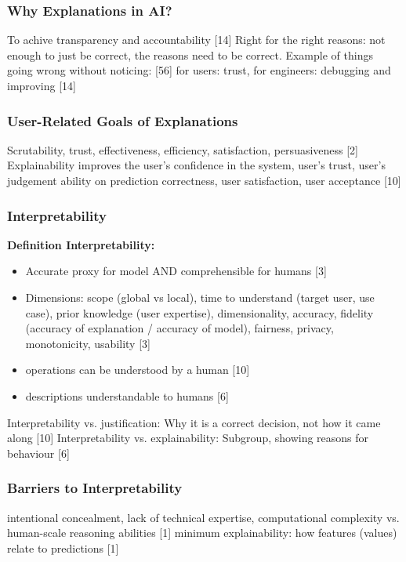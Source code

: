 \subsubsection{Why Explanations in AI?}
To achive transparency and accountability [14] \newline
Right for the right reasons: not enough to just be correct, the reasons need to be correct. Example of things going wrong without noticing: [56] \newline
for users: trust, for engineers: debugging and improving [14]\newline




\subsubsection{User-Related Goals of Explanations}
Scrutability, trust, effectiveness, efficiency, satisfaction, persuasiveness [2] \newline
Explainability improves the user's confidence in the system, user's trust, user's judgement ability on prediction correctness, user satisfaction, user acceptance [10] \newline




\subsubsection{Interpretability}
\textbf{Definition Interpretability:}
\begin{itemize}
	\item Accurate proxy for model AND comprehensible for humans [3]
	\item Dimensions: scope (global vs local), time to understand (target user, use case), prior knowledge (user expertise), dimensionality, accuracy, fidelity (accuracy of explanation / accuracy of model), fairness, privacy, monotonicity, usability [3]
	\item operations can be understood by a human [10]
	\item descriptions understandable to humans [6]
\end{itemize}
Interpretability vs. justification: Why it is a correct decision, not how it came along [10]\newline
Interpretability vs. explainability: Subgroup, showing reasons for behaviour [6] \newline 



\subsubsection{Barriers to Interpretability}
intentional concealment, lack of technical expertise, computational complexity vs. human-scale reasoning abilities [1] \newline
minimum explainability: how features (values) relate to predictions [1] \newline




